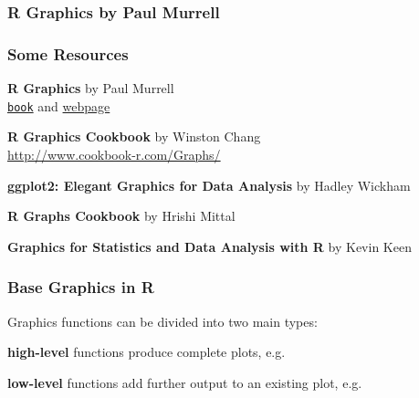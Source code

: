 \documentclass[12pt]{beamer}\usepackage[]{graphicx}\usepackage[]{color}
\begin{document}
\begin{frame}
\frametitle{R Graphics by Paul Murrell}
\begin{center}
\end{center}
\end{frame}


\begin{frame}
\frametitle{Some Resources}

\bi
 \item \textbf{R Graphics} by Paul Murrell \\
 \href{http://lux.e-reading.bz/bookreader.php/137370/C486x_C02.pdf}{\tt book} and \href{https://www.stat.auckland.ac.nz/~paul/RG2e/}{webpage}
 \item \textbf{R Graphics Cookbook} by Winston Chang \\
 \url{http://www.cookbook-r.com/Graphs/}
 \item \textbf{ggplot2: Elegant Graphics for Data Analysis} by Hadley Wickham
 \item \textbf{R Graphs Cookbook} by Hrishi Mittal
 \item \textbf{Graphics for Statistics and Data Analysis with R} by Kevin Keen
\ei

\end{frame}


\begin{frame}
\begin{center}
\Huge{}
\end{center}
\end{frame}


\begin{frame}
\frametitle{Base Graphics in R}

Graphics functions can be divided into two main types:
 \bi
  \item \textbf{high-level} functions produce complete plots, e.g. {\lit {}}
  \item \textbf{low-level} functions add further output to an existing plot, e.g. {\lit {}}
 \ei
\eb

\end{frame}
\end{document}
